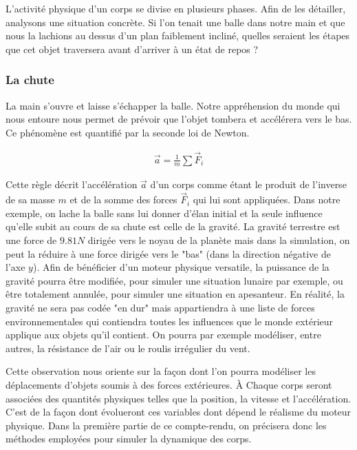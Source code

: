 L'activité physique d'un corps se divise en plusieurs phases. Afin de les détailler, analysons une situation concrète. Si l'on tenait une balle dans notre main et que nous la lachions au dessus d'un plan faiblement incliné, quelles seraient les étapes que cet objet traversera avant d'arriver à un état de repos ?

\subsubsection{La chute}

La main s'ouvre et laisse s'échapper la balle. Notre appréhension du monde qui nous entoure nous permet de prévoir que l'objet tombera et accélérera vers le bas. Ce phénomène est quantifié par la seconde loi de Newton.

\begin{align*}
  \vec{a} = \frac{1}{m} \sum{\vec{F}_i}
\end{align*}

Cette règle décrit l'accélération $\vec{a}$ d'un corps comme étant le produit de l'inverse de sa masse $m$ et de la somme des forces $\vec{F}_i$ qui lui sont appliquées. Dans notre exemple, on lache la balle sans lui donner d'élan initial et la seule influence qu'elle subit au cours de sa chute est celle de la gravité. La gravité terrestre est une force de $9.81 N$ dirigée vers le noyau de la planète mais dans la simulation, on peut la réduire à une force dirigée vers le "bas" (dans la direction négative de l'axe $y$). Afin de bénéficier d'un moteur physique versatile, la puissance de la gravité pourra être modifiée, pour simuler une situation lunaire par exemple, ou être totalement annulée, pour simuler une situation en apesanteur. En réalité, la gravité ne sera pas codée "en dur" mais appartiendra à une liste de forces environnementales qui contiendra toutes les influences que le monde extérieur applique aux objets qu'il contient. On pourra par exemple modéliser, entre autres, la résistance de l'air ou le roulis irrégulier du vent.

Cette observation nous oriente sur la façon dont l'on pourra modéliser les déplacements d'objets soumis à des forces extérieures. \`A Chaque corps seront associées des quantités physiques telles que la position, la vitesse et l'accélération. C'est de la façon dont évolueront ces variables dont dépend le réalisme du moteur physique. Dans la première partie de ce compte-rendu, on précisera donc les méthodes employées pour simuler la dynamique des corps.

